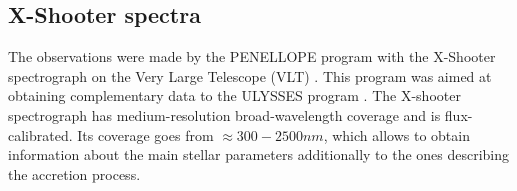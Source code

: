 \documentclass[twocolumn,linenumbers]{aastex631}
\newcommand{\Mdot}{{\dot{{M}}}}
\newcommand{\msun}{ M_{\sun}}
\newcommand{\rsun}{ R_{\sun}}
\newcommand{\lsun}{ L_{\sun}}
\newcommand{\msunyr}{M_{\sun} \, \rm{ yr^{-1}}}
\newcommand{\teff}{T$_{\rm eff}$}
\begin{document}
\begin{table}[]
\caption{Stellar parameters of the CTTS sample \citep{manara2021}}

\centering
{}
\end{table}

\subsection{X-Shooter spectra}

The observations were made by the PENELLOPE program with the X-Shooter spectrograph on the Very Large Telescope (VLT) \citep{vernet2011}. This program was aimed at obtaining complementary data to the ULYSSES program \citep{roman-duval2020}. The X-shooter spectrograph has medium-resolution broad-wavelength coverage and is flux-calibrated. Its coverage goes from $\approx 300-2500nm$, which allows to obtain information about the main stellar parameters additionally to the ones describing the accretion process.
\end{document}
